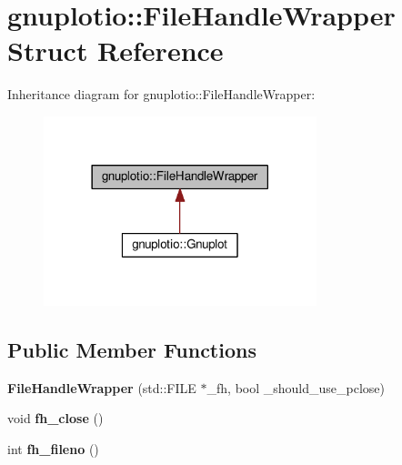 \hypertarget{structgnuplotio_1_1_file_handle_wrapper}{}\section{gnuplotio\+:\+:File\+Handle\+Wrapper Struct Reference}
\label{structgnuplotio_1_1_file_handle_wrapper}


Inheritance diagram for gnuplotio\+:\+:File\+Handle\+Wrapper\+:
\nopagebreak
\begin{figure}[H]
\begin{center}
\leavevmode
\includegraphics[width=225pt]{structgnuplotio_1_1_file_handle_wrapper__inherit__graph}
\end{center}
\end{figure}
\subsection*{Public Member Functions}
\begin{DoxyCompactItemize}
\item 
{\bfseries File\+Handle\+Wrapper} (std\+::\+F\+I\+LE $\ast$\+\_\+fh, bool \+\_\+should\+\_\+use\+\_\+pclose)\hypertarget{structgnuplotio_1_1_file_handle_wrapper_a26b2378e193a9c41be5aed97e11f9411}{}\label{structgnuplotio_1_1_file_handle_wrapper_a26b2378e193a9c41be5aed97e11f9411}

\item 
void {\bfseries fh\+\_\+close} ()\hypertarget{structgnuplotio_1_1_file_handle_wrapper_acafac45efd9c78ce621af4f3228c6f67}{}\label{structgnuplotio_1_1_file_handle_wrapper_acafac45efd9c78ce621af4f3228c6f67}

\item 
int {\bfseries fh\+\_\+fileno} ()\hypertarget{structgnuplotio_1_1_file_handle_wrapper_a3202ccd15d624f26dd2cf699d3456de6}{}\label{structgnuplotio_1_1_file_handle_wrapper_a3202ccd15d624f26dd2cf699d3456de6}

\end{DoxyCompactItemize}
